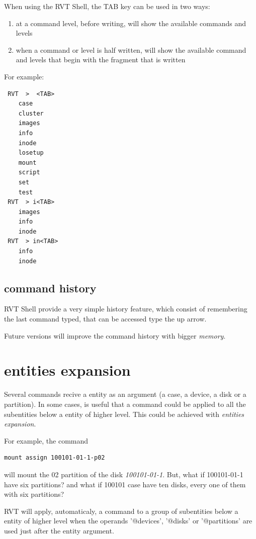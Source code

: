 \documentclass[a4paper,11pt,oneside]{report}
\begin{document}
When using the RVT Shell, the TAB key can be used in two ways:

\begin{enumerate}
\item at a command level, before writing, will show the available commands and levels
\item when a command or level is half written, will show the available command and levels that begin with the fragment that is written
\end{enumerate}

For example:

\begin{verbatim}
 RVT  >  <TAB>	
	case
	cluster
	images
	info
	inode
	losetup
	mount
	script
	set
	test
 RVT  > i<TAB>	
	images
	info
	inode
 RVT  > in<TAB>	
	info
	inode
\end{verbatim}


\subsection{command history}

RVT Shell provide a very simple history feature, which consist of remembering the last command typed, that can be accessed type the up arrow.

Future versions will improve the command history with bigger \emph{memory}.






\section{entities expansion}

Several commands recive a entity as an argument (a case, a device, a disk or a partition).  In some cases, is useful that a command could be applied to all the subentities below a entity of higher level. This could be achieved with \emph{entities expansion}.

For example, the command 

\begin{verbatim}
mount assign 100101-01-1-p02
\end{verbatim}

 will mount the 02 partition of the disk \emph{100101-01-1}.  But, what if 100101-01-1 have six partitions? and what if 100101 case have ten disks, every one of them with six partitions?

RVT will apply, automaticaly, a command to a group of subentities below a entity of higher level when the operands '@devices', '@disks' or '@partitions' are used just after the entity argument.
\end{document}
